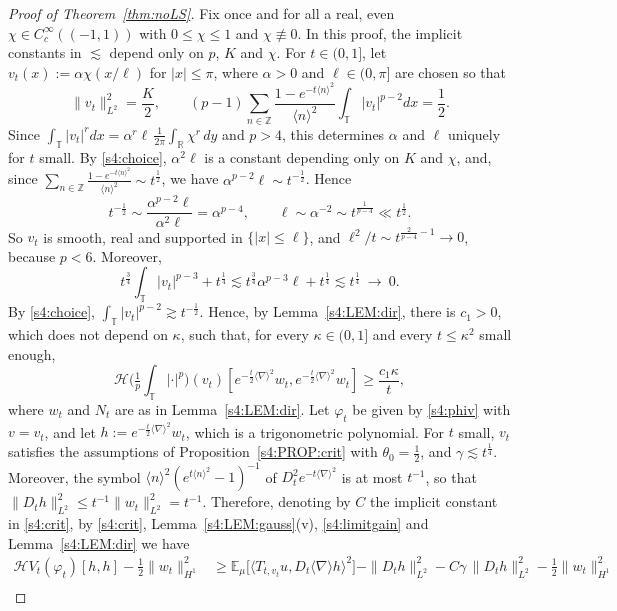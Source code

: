 \documentclass[letterpaper, 11pt,  reqno]{amsart}
\theoremstyle{definition}
\newcommand{\1}{\mathbbm 1}
\newcommand{\Z}{\mathbb{Z}}
\newcommand{\R}{\mathbb{R}}
\newcommand{\T}{\mathbb{T}}
\renewcommand{\H}{\mathcal H}
\newcommand{\0}{\mathbf 0}
\newcommand{\E}{\mathbb{E}}
\newcommand{\al}{\alpha}
\newcommand{\nb}{\nabla}
\newcommand{\g}{\gamma}
\newcommand{\les}{\lesssim}
\newcommand{\ges}{\gtrsim}
\newcommand{\jb}[1]
{\langle #1 \rangle}
\newcommand{\ph}{\varphi}
\renewcommand{\H}{\mathcal{H}}
\numberwithin{equation}{section}
\numberwithin{theorem}{section}
\newcommand{\HF}[2]{\mathcal H\big(\tfrac1p{\textstyle\int_\T}|\cdot|^p\big)(#1)[#2]}
\begin{document}
\begin{proof}[Proof of Theorem~\ref{thm:noLS}]
Fix once and for all a real, even $\chi\in C_c^\infty((-1,1))$ with
$0\le\chi\le1$ and $\chi\not\equiv0$. In this proof, the implicit constants in $\les$ depend
only on $p$, $K$ and $\chi$. For $t\in(0,1]$, let
$v_t(x):=\al\chi(x/\ell)$ for $|x|\le\pi$, where $\al>0$ and $\ell\in(0,\pi]$ are chosen so that
\begin{equation}\label{s4:choice}
\|v_t\|_{L^2}^2=\frac K2,\qquad (p-1)\sum_{n\in\Z}\frac{1-e^{-t\jb n^2}}{\jb n^2}\int_\T|v_t|^{p-2}dx=\frac12 .
\end{equation}
Since $\int_\T|v_t|^rdx=\al^r\ell\,\frac1{2\pi}\int_\R\chi^r\,dy$ and $p>4$, this determines
$\al$ and $\ell$ uniquely for $t$ small. By \eqref{s4:choice}, $\al^2\ell$ is a constant depending only on $K$ and $\chi$, and,
since $\sum_{n\in\Z}\frac{1-e^{-t\jb n^2}}{\jb n^2}\sim t^{\frac12}$, we have $\al^{p-2}\ell\sim t^{-\frac12}$. Hence
\[
t^{-\frac12}\sim\frac{\al^{p-2}\ell}{\al^2\ell}=\al^{p-4},\qquad\ell\sim\al^{-2}\sim t^{\frac1{p-4}}\ll t^\frac12.
\]
So $v_t$ is smooth, real and supported in $\{|x|\le\ell\}$, and
$\ell^2/t\sim t^{\frac2{p-4}-1}\to0$, because $p<6$. Moreover,
\[
t^{\frac34}\int_\T|v_t|^{p-3}+t^{\frac14}\les t^{\frac34}\al^{p-3}\ell+t^{\frac14}\les t^{\frac14}\ \longrightarrow\ 0 .
\]
By \eqref{s4:choice}, $\int_\T|v_t|^{p-2}\ges t^{-\frac12}$. Hence, by Lemma~\ref{s4:LEM:dir}, there is
$c_1>0$, which does not depend on $\kappa$, such that, for every $\kappa\in(0,1]$ and every $t\le\kappa^2$ small enough,
\begin{equation}\label{s4:limitgain}
\HF{v_t}{e^{-\frac t2\jb\nb^2}w_t,e^{-\frac t2\jb\nb^2}w_t}\ge\frac{c_1\kappa}t ,
\end{equation}
where $w_t$ and $N_t$ are as in Lemma~\ref{s4:LEM:dir}.
Let $\ph_t$ be given by \eqref{s4:phiv} with $v=v_t$, and let $h:=e^{-\frac t2\jb\nb^2}w_t$, which is a trigonometric polynomial.
For $t$ small, $v_t$ satisfies the assumptions of Proposition~\ref{s4:PROP:crit} with $\theta_0=\frac12$, and $\g\les t^{\frac14}$.
Moreover, the symbol $\jb n^2(e^{t\jb n^2}-1)^{-1}$ of $D_t^2e^{-t\jb\nb^2}$ is at most $t^{-1}$, so that
$\|D_th\|_{L^2}^2\le t^{-1}\|w_t\|_{L^2}^2=t^{-1}$. Therefore, denoting by $C$ the implicit constant in \eqref{s4:crit},
by \eqref{s4:crit}, Lemma~\ref{s4:LEM:gauss}(v), \eqref{s4:limitgain} and Lemma~\ref{s4:LEM:dir} we have
\begin{align*}
\H V_t(\ph_t)[h,h]-\frac12\|w_t\|_{H^1}^2
&\ge\E_\mu\big[\jb{T_{t,v_t}u,D_t\jb\nb h}^2\big]-\|D_th\|_{L^2}^2-C\g\,\|D_th\|_{L^2}^2-\frac12\|w_t\|_{H^1}^2\\

\end{align*}
\end{proof}
\end{document}
